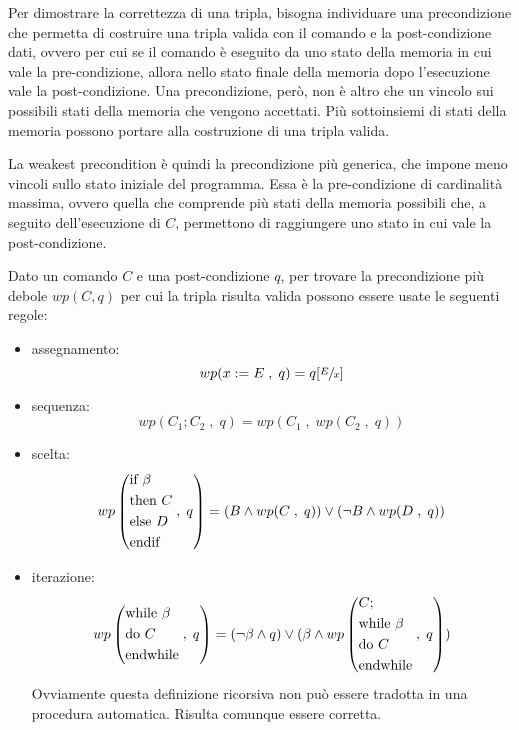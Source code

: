 Per dimostrare la correttezza di una tripla, bisogna individuare una
precondizione che permetta di costruire una tripla valida
con il comando e la post-condizione dati, ovvero per cui se il comando
è eseguito da uno stato della memoria in cui vale la pre-condizione, allora
nello stato finale della memoria dopo l'esecuzione vale la post-condizione.
Una precondizione, però, non è altro che un vincolo sui possibili stati della memoria
che vengono accettati. Più sottoinsiemi di stati della memoria possono
portare alla costruzione di una tripla valida.

La weakest precondition è quindi la precondizione più generica, che impone
meno vincoli sullo stato iniziale del programma. Essa è la pre-condizione
di cardinalità massima, ovvero quella che comprende più stati della memoria
possibili che, a seguito dell'esecuzione di $C$, permettono di raggiungere
uno stato in cui vale la post-condizione.

Dato un comando $C$ e una post-condizione $q$, per trovare la precondizione
più debole $wp(C, q)$ per cui la tripla risulta valida possono essere
usate le seguenti regole:
\begin{itemize}
    \item assegnamento:
    \[
        wp(x:=E \; , \; q) = q[\sfrac{E}{x}]
    \]
    \item sequenza:
    \[
        wp(C_1;C_2 \; , \; q) = wp(C_1 \; , \; wp(C_2 \; , \; q))
    \]
    \item scelta:
    \[
        wp \left(\begin{aligned}
            & \text{if } \beta\\
            & \text{then } C\\
            & \text{else } D\\
            & \text{endif}
        \end{aligned} \; , \; q\right) =
        (B \land wp(C \; , \; q)) \lor (\lnot B \land wp(D \; , \; q))
    \]
    \item iterazione:
    \[
        wp \left(\begin{aligned}
            & \textnormal{while } \beta\\
            & \textnormal{do } C\\
            & \textnormal{endwhile}
        \end{aligned} \; , \; q\right) =
        (\lnot \beta \land q) \lor (\beta \land
        wp \left(\begin{aligned}
            & C;\\
            & \text{while } \beta\\
            & \text{do } C\\
            & \text{endwhile}
        \end{aligned} \; , \; q\right))
    \]
    Ovviamente questa definizione ricorsiva non può essere tradotta in una procedura
    automatica. Risulta comunque essere corretta.
\end{itemize}

